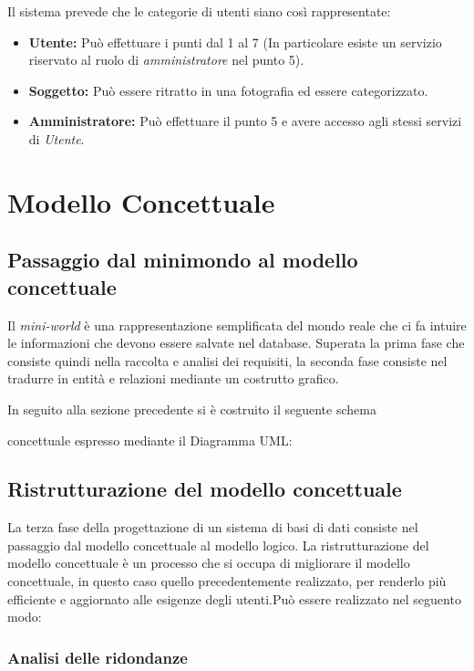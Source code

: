 \documentclass[a4paper,12pt,oneside]{book}
\begin{document}
    Il sistema prevede che le categorie di utenti siano così rappresentate:
    \begin{itemize}
        \item \textbf{Utente:} Può effettuare i punti dal 1 al 7 (In particolare esiste un servizio riservato al ruolo di \emph{amministratore} nel punto 5).

        \item \textbf{Soggetto:} Può essere ritratto in una fotografia ed essere categorizzato.

        \item \textbf{Amministratore:} Può effettuare il punto 5 e avere accesso agli stessi servizi di \emph{Utente}.
    \end{itemize} 
    \chapter{Modello Concettuale}
    \section{Passaggio dal minimondo al modello concettuale}\par
    Il \emph{mini-world} è una rappresentazione semplificata del mondo reale che ci fa intuire le informazioni che devono essere salvate nel database.
    Superata la prima fase che consiste quindi nella raccolta e analisi dei requisiti, la seconda fase consiste nel tradurre in entità e relazioni mediante un costrutto grafico.\par
    In seguito alla sezione precedente si è costruito il seguente schema\par concettuale espresso mediante il Diagramma UML:
    \section{Ristrutturazione del modello concettuale}
      La terza fase della progettazione di un sistema di basi di dati consiste nel passaggio dal modello concettuale al modello logico. La ristrutturazione del modello concettuale è un processo che si occupa di migliorare il modello concettuale, in questo caso quello precedentemente realizzato, per renderlo più efficiente e aggiornato alle esigenze degli utenti.Può essere realizzato nel seguento modo:
    \subsection{Analisi delle ridondanze}
  
\end{document}
